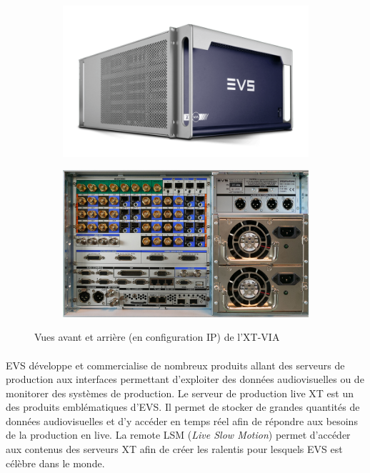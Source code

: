 \documentclass{article}
\begin{document}
    \begin{figure}[H]
        \centering
        \begin{subfigure}[b]{0.4\linewidth}
            \includegraphics[width=\linewidth]{./images/XT-VIA.png}
        \end{subfigure}
        \begin{subfigure}[b]{0.4\linewidth}
            \includegraphics[width=\linewidth]{./images/XT-VIA-ar.jpg}
        \end{subfigure}
        \caption{Vues avant et arrière (en configuration IP) de l'XT-VIA}
        \label{fig:xt-via}
    \end{figure}

    \paragraph{}
    EVS développe et commercialise de nombreux produits allant des serveurs de production aux interfaces permettant d'exploiter des données audiovisuelles ou de monitorer des systèmes de production\cite{EVS:products}. Le serveur de production live XT est un des produits emblématiques d'EVS. Il permet de stocker de grandes quantités de données audiovisuelles et d'y accéder en temps réel afin de répondre aux besoins de la production en live. La remote LSM (\emph{Live Slow Motion}) permet d'accéder aux contenus des serveurs XT afin de créer les ralentis pour lesquels EVS est célèbre dans le monde.
\end{document}
